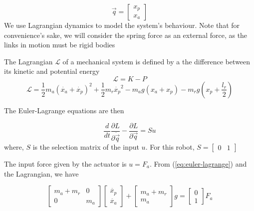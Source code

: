 \documentclass[12pt, a4paper]{report}
\begin{document}
\begin{equation}
	\vec{q} = \begin{bmatrix}
	x_{p}\\
	x_{a}
	\end{bmatrix}
\end{equation}
We use Lagrangian dynamics to model the system's behaviour. Note that for convenience's sake, we will consider the spring force as an external force, as the links in motion must be rigid bodies\par
The Lagrangian $\mathcal{L}$ of a mechanical system is defined by a the difference between its kinetic and potential energy
\begin{equation}
\mathcal{L} = K - P
\end{equation}
\begin{equation}
	\mathcal{L} = \frac{1}{2}m_{a}(\dot{x_{a}} + \dot{x_{p}})^{2}+\frac{1}{2}m_{r}\dot{x_{p}}^{2}-m_{a}g(x_{a}+x_{p})-m_{r}g(x_{p}+\frac{l_{r}}{2})
\end{equation}

The Euler-Lagrange equations are then

\begin{equation}
	\frac{d}{dt}\frac{\partial L}{\partial \dot{\vec{q}}} - \frac{\partial L}{\partial \vec{q}} = Su
	\label{eq:euler-lagrange}
\end{equation}
where,
$S$ is the selection matrix of the input $u$. For this robot, $S = \begin{bmatrix}
0&1
\end{bmatrix}$\par 
The input force given by the actuator is $u = F_{a}$. From (\ref{eq:euler-lagrange}) and the Lagrangian, we have

\begin{equation}
\begin{bmatrix}
m_{a} + m_{r}&0\\
0 & m_{a}
\end{bmatrix}
\begin{bmatrix}
\ddot{x_{p}}\\
\ddot{x_{a}}
\end{bmatrix}
+\begin{bmatrix}
m_{a}+m_{r}\\m_{a}
\end{bmatrix}g =
\begin{bmatrix}
0\\1
\end{bmatrix}
F_{a}
\label{eq:ballistic}
\end{equation}
\end{document}
